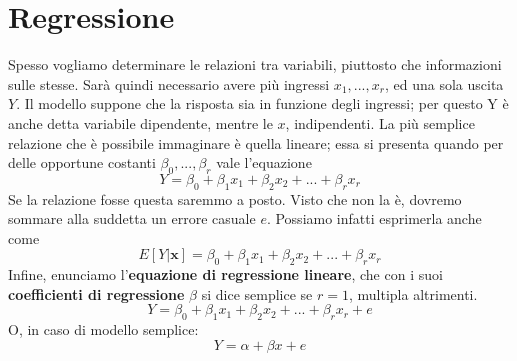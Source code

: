 \documentclass[11pt]{article}
\begin{document}
\section{Regressione}
Spesso vogliamo determinare le relazioni tra variabili, piuttosto che informazioni sulle stesse. Sarà quindi necessario avere più ingressi $x_1,...,x_r$, ed una sola uscita $Y$. Il modello suppone che la risposta sia in funzione degli ingressi; per questo Y è anche detta variabile dipendente, mentre le $x$, indipendenti. La più semplice relazione che è possibile immaginare è quella lineare; essa si presenta quando per delle opportune costanti $\beta_0,...,\beta_r$ vale l'equazione
\begin{displaymath}
    Y=\beta_0+\beta_1 x_1+\beta_2x_2+...+\beta_rx_r
\end{displaymath}
Se la relazione fosse questa saremmo a posto. Visto che non la è, dovremo sommare alla suddetta un errore casuale $e$. Possiamo infatti esprimerla anche come 
\begin{displaymath}
    E[Y|\textbf{x}]=\beta_0+\beta_1 x_1+\beta_2x_2+...+\beta_rx_r
\end{displaymath}
Infine, enunciamo l'\textbf{equazione di regressione lineare}, che con i suoi \textbf{coefficienti di regressione} $\beta$ si dice semplice se $r=1$, multipla altrimenti.
\begin{displaymath}
    Y=\beta_0+\beta_1 x_1+\beta_2x_2+...+\beta_rx_r+e
\end{displaymath}
O, in caso di modello semplice:
\begin{displaymath}
    Y=\alpha+\beta x+e
\end{displaymath}
\end{document}
